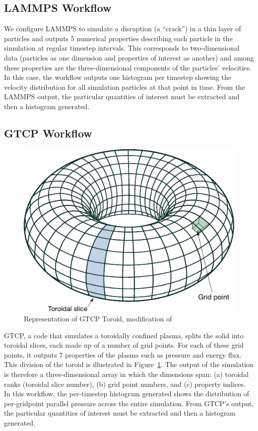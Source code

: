 \documentclass[conference]{IEEEtran}
\begin{document}
\subsection{LAMMPS Workflow}

We configure LAMMPS to simulate a disruption (a ``crack'') in a thin layer of
particles and outputs 5 numerical properties describing each particle in the
simulation at regular timestep intervals. This corresponds to two-dimensional
data (particles as one dimension and properties of interest as another) and
among these properties are the three-dimensional components of the particles'
velocities. In this case, the workflow outputs one histogram per timestep
showing the velocity distribution for all simulation particles at that point in
time.  From the LAMMPS output, the particular quantities of interest must be
extracted and then a histogram generated.

\subsection{GTCP Workflow}

\begin{figure}
\centering
\vspace{-0.10in}
  \includegraphics[width=0.7\columnwidth]{fig/Simple_Torus_mod}
\vspace{-0.15in}
  \caption{Representation of GTCP Toroid, modification of \cite{WikimediaCommons:torus}}
  \label{fig:toroid}
\vspace{-0.20in}
\end{figure}

GTCP, a code that simulates a toroidally confined plasma, splits the solid into
toroidal slices, each made up of a number of grid points. For each of these
grid points, it outputs 7 properties of the plasma such as pressure and energy
flux. This division of the toroid is illustrated in Figure~\ref{fig:toroid}.
The output of the simulation is therefore a three-dimensional array in which
the dimensions span: (a) toroidal ranks (toroidal slice number), (b) grid point
numbers, and (c) property indices. In this workflow, the per-timestep histogram
generated shows the distribution of per-gridpoint parallel pressure across
the entire simulation. From GTCP's output, the particular quantities of
interest must be extracted and then a histogram generated.
\end{document}
